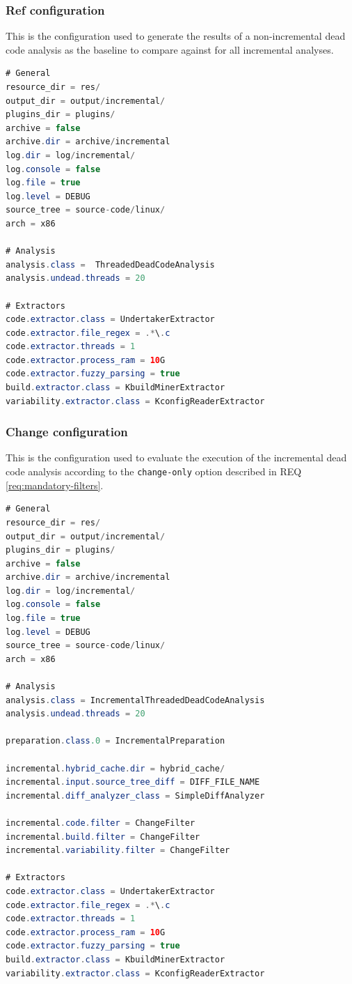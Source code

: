 \documentclass[a4paper]{article}
\begin{document}
\subsubsection{Ref configuration}

This is the configuration used to generate the results of a non-incremental dead code analysis as the baseline to compare against for all incremental analyses.

\begin{lstlisting}[language=java]
# General
resource_dir = res/
output_dir = output/incremental/
plugins_dir = plugins/
archive = false
archive.dir = archive/incremental
log.dir = log/incremental/
log.console = false
log.file = true
log.level = DEBUG
source_tree = source-code/linux/
arch = x86

# Analysis  
analysis.class =  ThreadedDeadCodeAnalysis
analysis.undead.threads = 20

# Extractors  
code.extractor.class = UndertakerExtractor
code.extractor.file_regex = .*\.c
code.extractor.threads = 1
code.extractor.process_ram = 10G
code.extractor.fuzzy_parsing = true
build.extractor.class = KbuildMinerExtractor
variability.extractor.class = KconfigReaderExtractor
\end{lstlisting}

\subsubsection{Change configuration}

This is the configuration used to evaluate the execution of the incremental dead code analysis according to the \texttt{change-only} option described in  REQ \ref{req:mandatory-filters}.

\begin{lstlisting}[language=java]
# General
resource_dir = res/
output_dir = output/incremental/
plugins_dir = plugins/
archive = false
archive.dir = archive/incremental
log.dir = log/incremental/
log.console = false
log.file = true
log.level = DEBUG
source_tree = source-code/linux/
arch = x86

# Analysis  
analysis.class = IncrementalThreadedDeadCodeAnalysis
analysis.undead.threads = 20

preparation.class.0 = IncrementalPreparation

incremental.hybrid_cache.dir = hybrid_cache/
incremental.input.source_tree_diff = DIFF_FILE_NAME
incremental.diff_analyzer_class = SimpleDiffAnalyzer

incremental.code.filter = ChangeFilter
incremental.build.filter = ChangeFilter
incremental.variability.filter = ChangeFilter

# Extractors  
code.extractor.class = UndertakerExtractor
code.extractor.file_regex = .*\.c
code.extractor.threads = 1
code.extractor.process_ram = 10G
code.extractor.fuzzy_parsing = true
build.extractor.class = KbuildMinerExtractor
variability.extractor.class = KconfigReaderExtractor

\end{lstlisting}
\end{document}
